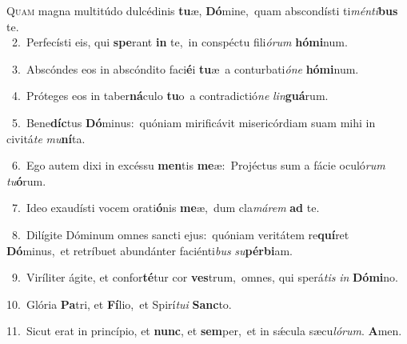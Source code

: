 \lettrine{\initial\textcolor{\initialcolor}{Q}}{uam} magna multitúdo dulcédinis \textbf{tu}\-æ, \textbf{Dó}\-mine,~\star quam abscondísti ti\-\textit{mén}\-\textit{ti}\textbf{bus} te.\\
{\numbfont\textcolor{\numbcolor}{~2.}}~Perfecísti eis, qui \textbf{spe}\-rant \textbf{in} te,~\star in conspéctu fili\-\textit{ó}\-\textit{rum} \textbf{hó}\-\textbf{mi}num.\par
{\numbfont\textcolor{\numbcolor}{~3.}}~Abscóndes eos in abscóndito faci\-\textbf{é}\-i \textbf{tu}\-æ~\star a conturbati\-\textit{ó}\-\textit{ne} \textbf{hó}\-\textbf{mi}num.\par
{\numbfont\textcolor{\numbcolor}{~4.}}~Próteges eos in taber\-\textbf{ná}\-culo \textbf{tu}\-o~\star a contradictió\textit{ne} \textit{lin}\-\textbf{guá}rum.\par
{\numbfont\textcolor{\numbcolor}{~5.}}~Bene\-\textbf{díc}\-tus \textbf{Dó}\-minus:~\star quóniam mirificávit misericórdiam suam mihi in civitá\textit{te} \textit{mu}\-\textbf{ní}ta.\par
{\numbfont\textcolor{\numbcolor}{~6.}}~Ego autem dixi in excéssu \textbf{men}\-tis \textbf{me}\-æ:~\star Projéctus sum a fácie oculó\textit{rum} \textit{tu}\-\textbf{ó}rum.\par
{\numbfont\textcolor{\numbcolor}{~7.}}~Ideo exaudísti vocem orati\-\textbf{ó}\-nis \textbf{me}\-æ,~\star dum cla\-\textit{má}\-\textit{rem} \textbf{ad} te.\par
{\numbfont\textcolor{\numbcolor}{~8.}}~Dilígite Dóminum omnes sancti ejus:~\dagger quóniam veritátem re\-\textbf{quí}\-ret \textbf{Dó}\-minus,~\star et retríbuet abundánter faciénti\textit{bus} \textit{su}\-\textbf{pér}\textbf{bi}am.\par
{\numbfont\textcolor{\numbcolor}{~9.}}~Viríliter ágite, et confor\-\textbf{té}\-tur cor \textbf{ves}\-trum,~\star omnes, qui sperá\textit{tis} \textit{in} \textbf{Dó}\-\textbf{mi}no.\par
{\numbfont\textcolor{\numbcolor}{10.}}~Glória \textbf{Pa}\-tri, et \textbf{Fí}\-lio,~\star et Spirí\-\textit{tu}\-\textit{i} \textbf{Sanc}\-to.\par
{\numbfont\textcolor{\numbcolor}{11.}}~Sicut erat in princípio, et \textbf{nunc}\-, et \textbf{sem}\-per,~\star et in sǽcula sæcu\-\textit{ló}\-\textit{rum}. \textbf{A}\-men.\par
